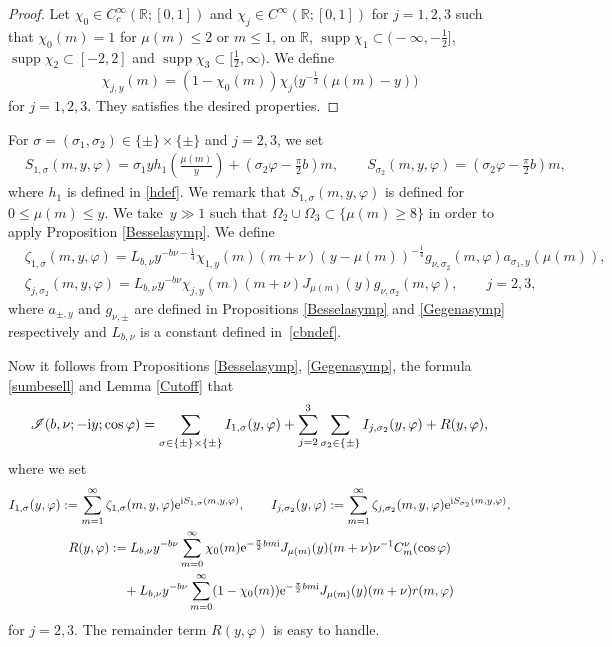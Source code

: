 \documentclass[10pt,a4paper]{amsart}
\numberwithin{equation}{section}
\def\R{\mathbb{R}}%
\DeclareMathOperator{\supp}{supp}%
\def\f{\varphi}
\def\m{\mu}
\def\n{\nu}
\def\s{\sigma}
\def\z{\zeta}
\newcommand{\sI}{\mathscr{I}}
\begin{document}
\begin{proof}
Let $\chi_0\in C_c^{\infty}(\R;[0,1])$ and $\chi_j\in C^{\infty}(\R;[0,1])$ for $j=1,2,3$ such that $\chi_0(m)=1$ for $\m(m)\leq 2$ or $m\leq 1$,  on $\R$, $\supp \chi_1\subset \bigl(-\infty,-\frac{1}{2}\bigr]$, $\supp \chi_2\subset [-2,2]$ and $\supp \chi_3\subset \bigl[\frac{1}{2},\infty\bigr)$. We define
\begin{align*}
\chi_{j,y}(m)=(1-\chi_0(m))\chi_j\bigl(y^{-\frac{1}{3}}(\m(m)-y)\bigr)
\end{align*}
for $j=1,2,3$.
They satisfies the desired properties.
\end{proof}

For $\s=(\s_1,\s_2)\in \{\pm\}\times \{\pm\}$ and $j=2,3$, we set
\begin{align*}
&S_{1,\s}(m,y,\f)=\s_1yh_1\left(\frac{\m(m)}{y}\right) +\left(\s_2\f-\frac{\pi}{2}b\right)m,\qquad S_{\s_2}(m,y,\f)=\left(\s_2\f-\frac{\pi}{2}b\right)m,
\end{align*}
where $h_1$ is defined in \eqref{hdef}. We remark that $S_{1,\sigma}(m,y,\f)$ is defined for $0\le \m(m)\le y$.
We take~${y\gg 1}$ such that $\Omega_2\cup \Omega_3\subset \{\m(m)\geq 8\}$ in order to apply Proposition \ref{Besselasymp}.
We define
\begin{align*}
&\z_{1,\s}(m,y,\f)=L_{b,\n}y^{-b\n-\frac{1}{4}}\chi_{1,y}(m)(m+\n)(y-\m(m))^{-\frac{1}{4}}g_{\n,\s_2}(m,\f)a_{\s_1,y}(\m(m)),\\
&\z_{j,\s_2}(m,y,\f)=L_{b,\n}y^{-b\n}\chi_{j,y}(m)(m+\n)J_{\m(m)}(y)g_{\n,\s_2}(m,\f),\qquad j=2,3,
\end{align*}
where $a_{\pm,y}$ and $g_{\n,\pm}$ are defined in Propositions \ref{Besselasymp} and \ref{Gegenasymp} respectively and $L_{b,\n}$ is a constant defined in~\eqref{cbndef}.

Now it follows from Propositions \ref{Besselasymp}, \ref{Gegenasymp}, the formula \eqref{sumbesell} and Lemma \ref{Cutoff} that
\begin{align}\label{sIdecom}
\sI(b,\nu;- {\rm i}y;\cos\f)=\sum_{\s\in \{\pm\}\times \{\pm\}}I_{1,\s}(y,\f)+\sum_{j=2}^3\sum_{\s_2\in \{\pm\}}I_{j,\s_2}(y,\f)+R(y,\f),
\end{align}
where we set
\begin{gather*}
I_{1,\s}(y,\f):=\sum_{m=1}^{\infty}\z_{1,\s}(m,y,\f){\rm e}^{{\rm i}S_{1,\s}(m,y,\f)},\qquad I_{j,\s_2}(y,\f):=\sum_{m=1}^{\infty}\z_{j,\s_2}(m,y,\f){\rm e}^{{\rm i}S_{\s_2}(m,y,\f)},\\
R(y,\f):=L_{b,\n}y^{-b\n}\sum_{m=0}^{\infty}\chi_0(m){\rm e}^{-\frac{\pi}{2}bm{\rm i}}J_{\m(m)}(y)(m+\nu)\n^{-1}C^{\nu}_m(\cos\f)\\
\phantom{R(y,\f):=}{}+L_{b,\n}y^{-b\n}\sum_{m=0}^{\infty}
(1-\chi_0(m))
{\rm e}^{-\frac{\pi}{2}bm{\rm i}}J_{\m(m)}(y)(m+\nu)r(m,\f)
\end{gather*}
for $j=2,3$.
The remainder term $R(y,\f)$ is easy to handle.
\end{document}
